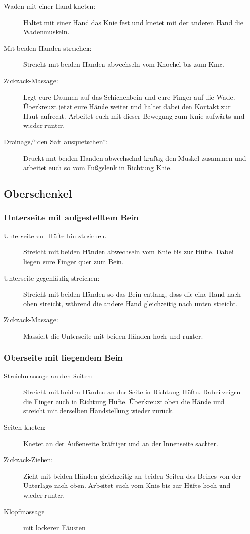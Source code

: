 \begin{description}
  \item [Waden mit einer Hand kneten:] Haltet mit einer Hand das Knie fest und knetet mit der anderen Hand die Wadenmuskeln.
  \item [Mit beiden Händen streichen:] Streicht mit beiden Händen abwechseln vom Knöchel bis zum Knie.
  \item [Zickzack-Massage:] Legt eure Daumen auf das Schienenbein und eure Finger auf die Wade. Überkreuzt jetzt eure Hände weiter und haltet dabei den Kontakt zur Haut aufrecht. Arbeitet euch mit dieser Bewegung zum Knie aufwärts und wieder runter.
  \item [Drainage/"`den Saft ausquetschen"':] Drückt mit beiden Händen abwechselnd kräftig den Muskel zusammen und arbeitet euch so vom Fußgelenk in Richtung Knie.
\end{description}

\subsection{Oberschenkel}

\subsubsection{Unterseite mit aufgestelltem Bein}

\begin{description}
  \item [Unterseite zur Hüfte hin streichen:] Streicht mit beiden Händen abwechseln vom Knie bis zur Hüfte. Dabei liegen eure Finger quer zum Bein.
  \item [Unterseite gegenläufig streichen:] Streicht mit beiden Händen so das Bein entlang, dass die eine Hand nach oben streicht, während die andere Hand gleichzeitig nach unten streicht.
  \item [Zickzack-Massage:] Massiert die Unterseite mit beiden Händen hoch und runter.
\end{description}

\subsubsection{Oberseite mit liegendem Bein}

\begin{description}
  \item [Streichmassage an den Seiten:] Streicht mit beiden Händen an der Seite in Richtung Hüfte. Dabei zeigen die Finger auch in Richtung Hüfte. Überkreuzt oben die Hände und streicht mit derselben Handstellung wieder zurück.
  \item [Seiten kneten:] Knetet an der Außenseite kräftiger und an der Innenseite sachter.
  \item [Zickzack-Ziehen:] Zieht mit beiden Händen gleichzeitig an beiden Seiten des Beines von der Unterlage nach oben. Arbeitet euch vom Knie bis zur Hüfte hoch und wieder runter.
  \item [Klopfmassage] mit lockeren Fäusten
\end{description}


